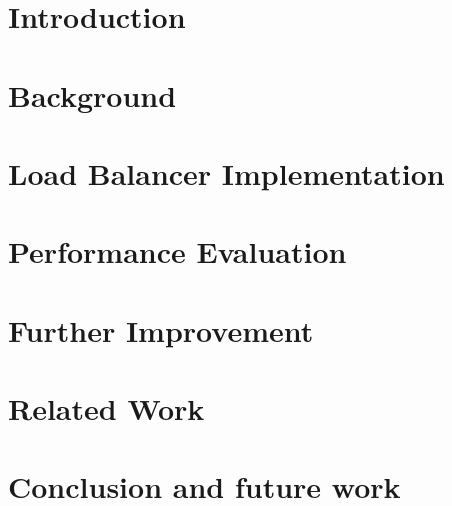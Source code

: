 
\graphicspath{{Manuscript/}}

\chapter{Introduction}\label{chapter:introduction}


\chapter{Background}\label{chapter:background}


\chapter{Load Balancer Implementation}\label{chapter:lb_implementation}


\chapter{Performance Evaluation}\label{chapter:evaluation}


\chapter{Further Improvement}\label{chapter:performance}


\chapter{Related Work}\label{chapter:related}


\chapter{Conclusion and future work }\label{chapter:conclusion}



%


